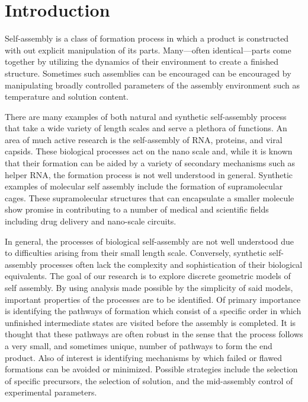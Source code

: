 \documentclass[12pt]{article}
\begin{document}
\maketitle


\section{Introduction}

Self-assembly is a class of formation process in which a product is constructed with out explicit manipulation of its parts. Many---often identical---parts come together by utilizing the dynamics of their environment to create a finished structure. Sometimes such assemblies can be encouraged can be encouraged by manipulating broadly controlled parameters of the assembly environment such as temperature and solution content. 

There are many examples of both natural and synthetic self-assembly process that take a wide variety of length scales and serve a plethora of functions. An area of much active research is the self-assembly of RNA, proteins, and viral capsids. These biological processes act on the nano scale and, while it is known that their formation can be aided by a variety of secondary mechanisms such as helper RNA, the formation process is not well understood in general. Synthetic examples of molecular self assembly include the formation of supramolecular cages. These supramolecular structures that can encapsulate a smaller molecule show promise in contributing to a number of medical and scientific fields including drug delivery and nano-scale circuits. 

In general, the processes of biological self-assembly are not well understood due to difficulties arising from their small length scale. Conversely, synthetic self-assembly processes often lack the complexity and sophistication of their biological equivalents. The goal of our research is to explore discrete geometric models of self assembly. By using analysis made possible by the simplicity of said models, important properties of the processes are to be identified. Of primary importance is identifying the pathways of formation which consist of a specific order in which unfinished intermediate states are visited before the assembly is completed. It is thought that these pathways are often robust in the sense that the process follows a very small, and sometimes unique, number of pathways to form the end product. Also of interest is identifying mechanisms by which failed or flawed formations can be avoided or minimized. Possible strategies include the selection of specific precursors, the selection of solution, and the mid-assembly control of experimental parameters. 
\end{document}
